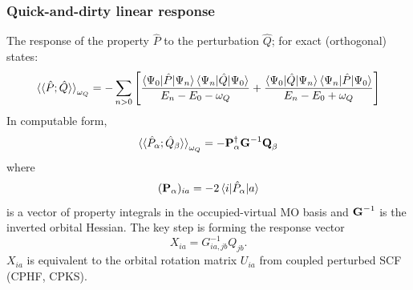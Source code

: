 \documentclass{beamer}
\begin{document}
\begin{frame}
  \frametitle{Quick-and-dirty linear response}
  The response of the property \(\hat{P}\) to the perturbation \(\hat{Q}\); for exact (orthogonal) states:
  \begin{equation*}
    \braket{\braket{\hat{P};\hat{Q}}}_{\omega_{Q}} = - \sum_{n>0} \left[ \frac{\braket{\Psi_{0}|\hat{P}|\Psi_{n}}\braket{\Psi_{n}|\hat{Q}|\Psi_{0}}}{E_{n} - E_{0} - \omega_{Q}} + \frac{\braket{\Psi_{0}|\hat{Q}|\Psi_{n}}\braket{\Psi_{n}|\hat{P}|\Psi_{0}}}{E_{n} - E_{0} + \omega_{Q}} \right]
  \end{equation*}
  In computable form,
  \begin{equation*}
    \braket{\braket{\hat{P}_{\alpha};\hat{Q}_{\beta}}}_{\omega_{Q}} = - \boldsymbol{\mathbf{P}}_{\alpha}^{\dagger} \boldsymbol{\mathbf{G}}^{-1} \boldsymbol{\mathbf{Q}}_{\beta}
  \end{equation*}
  where
  \begin{equation*}
    (\boldsymbol{\mathbf{P}}_{\alpha})_{ia} = -2 \braket{ i | \hat{P}_{\alpha} | a }
  \end{equation*}
  is a vector of property integrals in the occupied-virtual MO basis and \(\boldsymbol{\mathbf{G}}^{-1}\) is the inverted orbital Hessian. The key step is forming the response vector
  \begin{equation*}
    X_{ia} = G_{ia,jb}^{-1} Q_{jb}.
  \end{equation*}
  \(X_{ia}\) is equivalent to the orbital rotation matrix \(U_{ia}\) from coupled perturbed SCF (CPHF, CPKS).
\end{frame}


\end{document}
